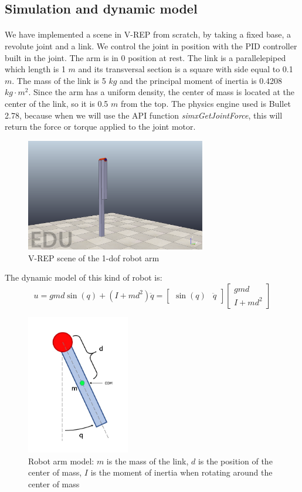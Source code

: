 \documentclass{article}
\begin{document}
\subsection{Simulation and dynamic model}
\paragraph{} We have implemented a scene in V-REP from scratch, by taking a fixed base, a revolute joint and a link. We control the joint in position with the PID controller built in the joint. The arm is in 0 position at rest. The link is a parallelepiped which length is 1 $m$ and its transversal section is a square with side equal to 0.1 $m$. The mass of the link is 5 $kg$ and the principal moment of inertia is 0.4208 $kg\cdot m^2$. Since the arm has a uniform density, the center of mass is located at the center of the link, so it is 0.5 $m$ from the top. The physics engine used is Bullet 2.78, because when we will use the API function \textit{simxGetJointForce}, this will return the force or torque applied to the joint motor.
\begin{figure}[!htbp]
\centering
\includegraphics[width=0.7\textwidth]{images/1-dof/scene.png}
\caption{V-REP scene of the 1-dof robot arm}
\end{figure}
\FloatBarrier
The dynamic model of this kind of robot is:
\[u=gmd \sin(q) + (I+md^2)\ddot{q}= \begin{bmatrix}
\sin(q) & \ddot{q}
\end{bmatrix}\begin{bmatrix}
gmd \\ I +md^2
\end{bmatrix}\]
\begin{figure}[!htbp]
\centering
\includegraphics[width=0.4\textwidth]{images/1-dof/model.jpeg}
\caption{Robot arm model: $m$ is the mass of the link, $d$ is the position of the center of mass, $I$ is the moment of inertia when rotating around the center of mass}
\end{figure}
\end{document}
